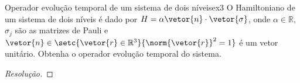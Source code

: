 \begin{exercício}{Operador evolução temporal de um sistema de dois níveis}{ex3}
   O Hamiltoniano de um sistema de dois níveis é dado por \(H = \alpha \vetor{n} \cdot \vetor{\sigma}\), onde \(\alpha \in \mathbb{R},\) \(\sigma_j\) são as matrizes de Pauli e \(\vetor{n} \in \setc{\vetor{r} \in \mathbb{R}^3}{\norm{\vetor{r}}^2 = 1}\) é um vetor unitário. Obtenha o operador evolução temporal do sistema.
\end{exercício}
\begin{proof}[Resolução]
    
\end{proof}
